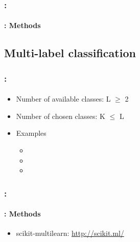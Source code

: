\documentclass[xcolor=table]{beamer}
\begin{document}
\begin{frame}
	\frametitle{\insertshortsubtitle: \insertsection}
	\framesubtitle{\insertsubsection: Methods}
	
	
\end{frame}

\subsection{Multi-label classification}

\begin{frame}
	\frametitle{\insertshortsubtitle: \insertsection}
	\framesubtitle{\insertsubsection}
	
	\begin{minipage}{0.65\textwidth}
	\begin{itemize}
		\item Number of available classes: L $ \ge $ 2
		\item Number of chosen classes: K $ \le $ L
		\item Examples
		\begin{itemize}
			\item {}
			\item {}
			\item {}
		\end{itemize}
	\end{itemize}
	\end{minipage}
	\begin{minipage}{0.3\textwidth}
	\end{minipage}
	
\end{frame}

\begin{frame}
	\frametitle{\insertshortsubtitle: \insertsection}
	\framesubtitle{\insertsubsection: Methods \cite{2012-madjarov-al}}
	
	
	\begin{itemize}
		\item scikit-multilearn: \url{http://scikit.ml/}
	\end{itemize}
	
\end{frame}
\end{document}
